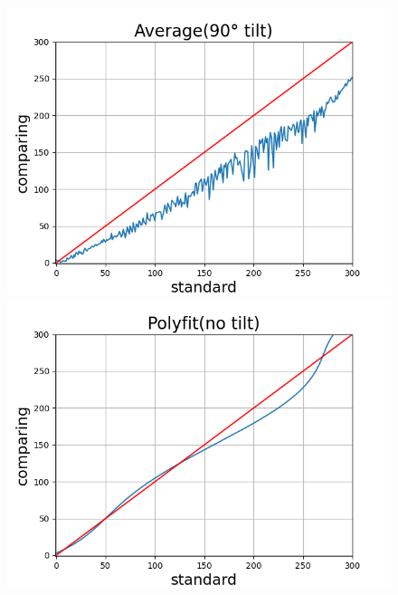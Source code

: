 \documentclass[conference]{IEEEtran}
\begin{document}
\begin{figure}[htbp]
\begin{minipage}[t]{0.32\textwidth}
  \end{minipage}
  \hfill
  \begin{minipage}[t]{0.32\textwidth}
    \centering
    \includegraphics[width=\textwidth]{pics/Section3/Average90.png}

  \end{minipage}

  \vspace{1em}

  \begin{minipage}[t]{0.32\textwidth}
    \centering
    \includegraphics[width=\textwidth]{pics/Section3/Polyfit0.png}


\end{minipage}
\end{figure}
\end{document}
